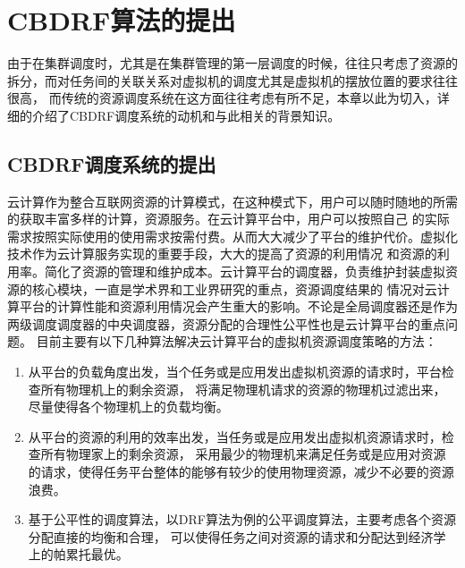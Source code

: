 \chapter{CBDRF算法的提出}
\label{chap:outline}

由于在集群调度时，尤其是在集群管理的第一层调度的时候，往往只考虑了资源的拆分，而对任务间的关联关系对虚拟机的调度尤其是虚拟机的摆放位置的要求往往很高，
而传统的资源调度系统在这方面往往考虑有所不足，本章以此为切入，详细的介绍了CBDRF调度系统的动机和与此相关的背景知识。

\section{CBDRF调度系统的提出}

云计算作为整合互联网资源的计算模式，在这种模式下，用户可以随时随地的所需的获取丰富多样的计算，资源服务。在云计算平台中，用户可以按照自己
的实际需求按照实际使用的使用需求按需付费。从而大大减少了平台的维护代价。虚拟化技术作为云计算服务实现的重要手段，大大的提高了资源的利用情况
和资源的利用率。简化了资源的管理和维护成本。云计算平台的调度器，负责维护封装虚拟资源的核心模块，一直是学术界和工业界研究的重点，资源调度结果的
情况对云计算平台的计算性能和资源利用情况会产生重大的影响。不论是全局调度器还是作为两级调度调度器的中央调度器，资源分配的合理性公平性也是云计算平台的重点问题。
目前主要有以下几种算法解决云计算平台的虚拟机资源调度策略的方法：
 \begin{enumerate}
\item 从平台的负载角度出发，当个任务或是应用发出虚拟机资源的请求时，平台检查所有物理机上的剩余资源，
将满足物理机请求的资源的物理机过滤出来，尽量使得各个物理机上的负载均衡。
\item 从平台的资源的利用的效率出发，当任务或是应用发出虚拟机资源请求时，检查所有物理家上的剩余资源，
采用最少的物理机来满足任务或是应用对资源的请求，使得任务平台整体的能够有较少的使用物理资源，减少不必要的资源浪费。
\item 基于公平性的调度算法，以DRF算法为例的公平调度算法，主要考虑各个资源分配直接的均衡和合理，
可以使得任务之间对资源的请求和分配达到经济学上的帕累托最优。
\end{enumerate}

